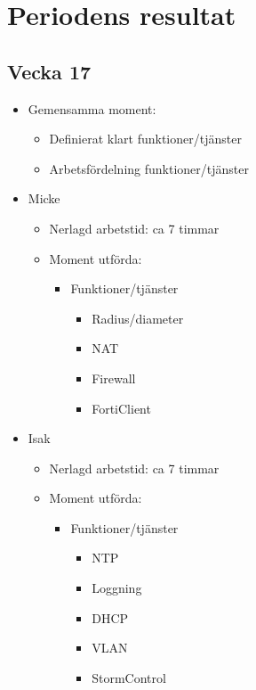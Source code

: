 \section{Periodens resultat}
\subsection*{Vecka 17}

\begin{itemize}[noitemsep]
    \item Gemensamma moment:
    \begin{itemize}[noitemsep]
    	\item Definierat klart funktioner/tjänster
        \item Arbetsfördelning funktioner/tjänster
    \end{itemize}
    \item Micke
    \begin{itemize}[noitemsep]
        \item Nerlagd arbetstid: ca 7 timmar
        \item Moment utförda:
        \begin{itemize}[noitemsep]
            \item Funktioner/tjänster
            \begin{itemize}
            	\item Radius/diameter
            	\item NAT
            	\item Firewall
            	\item FortiClient
            \end{itemize}
		\end{itemize}           
    \end{itemize}
    \item Isak
    \begin{itemize}[noitemsep]
        \item Nerlagd arbetstid: ca 7 timmar
        \item Moment utförda:
        \begin{itemize}[noitemsep]
        	\item Funktioner/tjänster
        	\begin{itemize}
        		\item NTP
        		\item Loggning
        		\item DHCP
        		\item VLAN
        		\item StormControl

\end{itemize}
\end{itemize}
\end{itemize}
\end{itemize}
